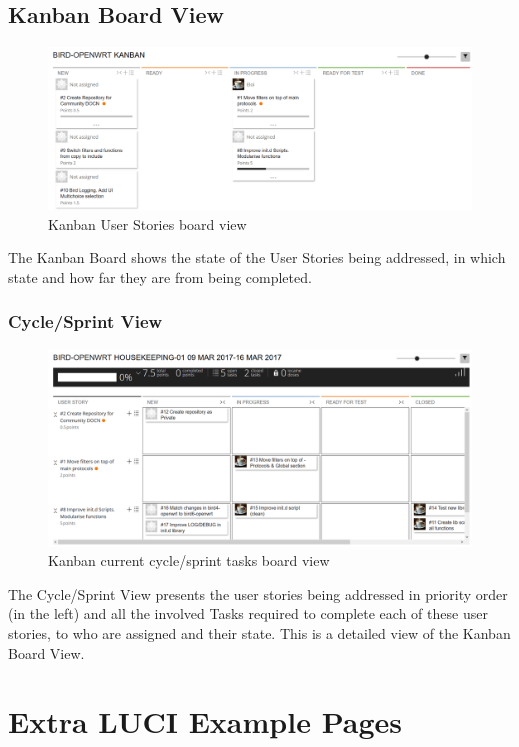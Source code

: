 \begin{appendices}
\begin{landscape}
\section{Kanban Board View}
\begin{figure}[ht!]
\centering
    \includegraphics[width=0.85\hsize]{images/kanban/kanban}
    \caption{Kanban User Stories board view}
    \label{fig:kboard}
\end{figure}
The Kanban Board shows the state of the User Stories being addressed, in which state and how far they are from being completed.
\newpage

\subsection{Cycle/Sprint View}
\begin{figure}[ht!]
\centering
    \includegraphics[width=0.85\hsize]{images/kanban/cycle}
    \caption{Kanban current cycle/sprint tasks board view}
    \label{fig:kcycle}
\end{figure}
The Cycle/Sprint View presents the user stories being addressed in priority order (in the left) and all the involved Tasks required to complete each of these user stories, to who are assigned and their state. This is a detailed view of the Kanban Board View.

\end{landscape}

\chapter{Extra LUCI Example Pages}
\label{app:ch:extrap}


\end{appendices}
